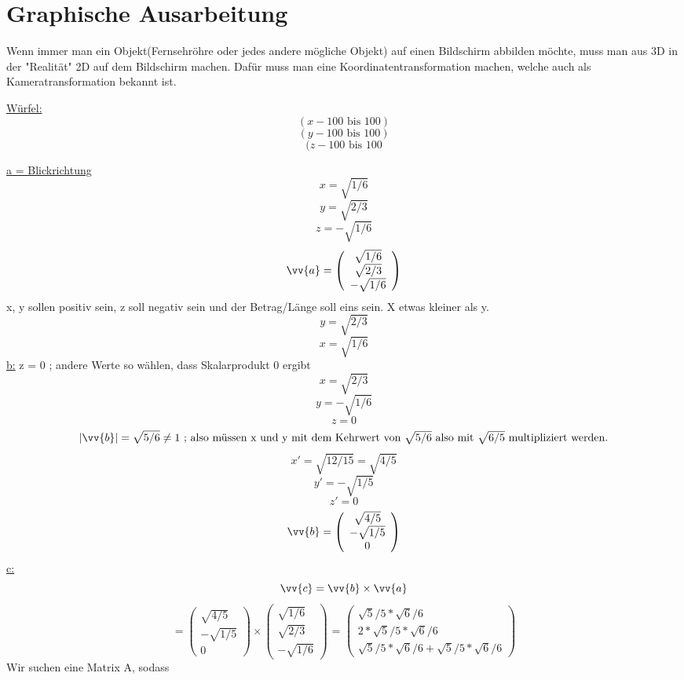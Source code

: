 \section{\textbf{Graphische Ausarbeitung}}

Wenn immer man ein Objekt(Fernsehröhre oder jedes andere mögliche Objekt) auf einen Bildschirm abbilden möchte, muss man aus 3D in der "Realität" 2D auf dem Bildschirm machen. Dafür muss man eine Koordinatentransformation machen, welche auch als Kameratransformation bekannt ist.

\underline{Würfel:}
$$(x -100 \mbox{ bis }  100)$$
$$(y-100\mbox{ bis }100)$$
$$(z-100\mbox{ bis }100$$


\underline{a = Blickrichtung}
$$x = \sqrt{1/6}$$
$$y = \sqrt{2/3}$$
$$z = -\sqrt{1/6}$$
$$\vv{a}=\left(\begin{array}{c} 
     \sqrt{1/6}\\ \sqrt{2/3}\\-\sqrt{1/6}\end{array}\right) $$
x, y sollen positiv sein, z soll negativ sein und der Betrag/Länge soll eins sein. X etwas kleiner als y.
$$y= \sqrt{2/3}$$
$$x= \sqrt{1/6}$$
\underline{b:}
z = 0 ; andere Werte so wählen, dass Skalarprodukt 0 ergibt
$$x= \sqrt{2/3}$$
$$y=-\sqrt{1/6}$$
$$z=0$$
$$|\vv{b}| = \sqrt{5/6}\neq 1\mbox{ ; also müssen x und y mit dem Kehrwert von $\sqrt{5/6}$ also mit $\sqrt{6/5}$ multipliziert werden.}$$
$$x' = \sqrt{12/15} = \sqrt{4/5}$$
$$y' = - \sqrt{1/5}$$
$$z' = 0$$
$$\vv{b}=\left(\begin{array}{c} 
      \sqrt{4/5}\\ -\sqrt{1/5}\\0\end{array}\right) $$
\underline{c:}
$$\vv{c} = \vv{b}\times  \vv{a}$$
$$= \left(\begin{array}{c} 
     \sqrt{4/5}\\-\sqrt{1/5}\\0\end{array}\right)
      \times \left(\begin{array}{c} 
     \sqrt{1/6}\\\sqrt{2/3}\\-\sqrt{1/6}\end{array}\right) \mbox{ = } 
     \left(\begin{array}{c} 
     \sqrt{5}/5*\sqrt{6}/6\\2*\sqrt{5}/5*\sqrt{6}/6\\\sqrt{5}/5*\sqrt{6}/6+ \sqrt{5}/5*\sqrt{6}/6\end{array}\right)
$$
Wir suchen eine Matrix A, sodass

